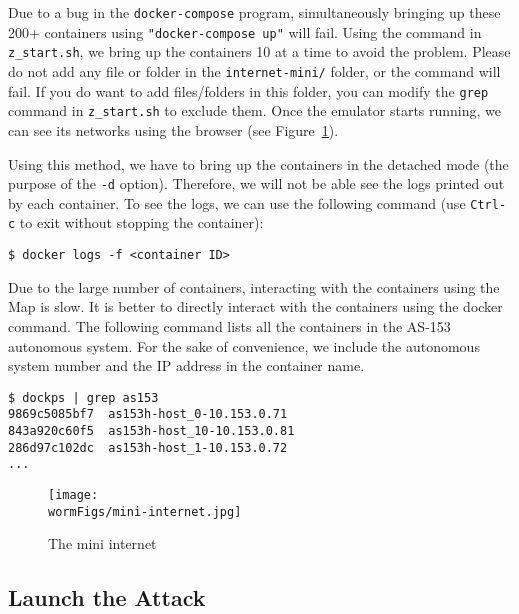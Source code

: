 Due to a bug in the \texttt{docker-compose} program, 
simultaneously bringing up these 200+ containers using 
\texttt{"docker-compose up"} will fail.
Using the command in \texttt{z\_start.sh}, we bring 
up the containers 10 at a time to avoid the problem. 
Please do not add any file or folder in the \texttt{internet-mini/}
folder, or the command will fail. 
If you do want to add files/folders in this folder, you can modify the 
\texttt{grep} command in \texttt{z\_start.sh} 
to exclude them. 
Once the emulator starts running, we can see its networks
using the browser (see Figure~\ref{fig:mini-internet}).


Using this method, we have to bring up the containers in the detached
mode (the purpose of the \texttt{-d} option). Therefore, we will not be able
see the logs printed out by each container. To see the logs, 
we can use the following command (use \texttt{Ctrl-c} to
exit without stopping the container):

\begin{lstlisting}
$ docker logs -f <container ID>
\end{lstlisting}

Due to the large number of containers, interacting 
with the containers using the Map is slow. It is better to directly
interact with the containers using the docker command. 
The following command lists all the containers in the AS-153 autonomous
system. For the sake of convenience, we include the autonomous 
system number and the IP address in the container name.

\begin{lstlisting}
$ dockps | grep as153
9869c5085bf7  as153h-host_0-10.153.0.71
843a920c60f5  as153h-host_10-10.153.0.81
286d97c102dc  as153h-host_1-10.153.0.72
...
\end{lstlisting}
 


\begin{figure}[htb]
  \begin{center}
    \texttt{[image: \\wormFigs/mini-internet.jpg]}
  \end{center}
  \caption{The mini internet}
  \label{fig:mini-internet}
\end{figure}
 




\subsection{Launch the Attack} 

